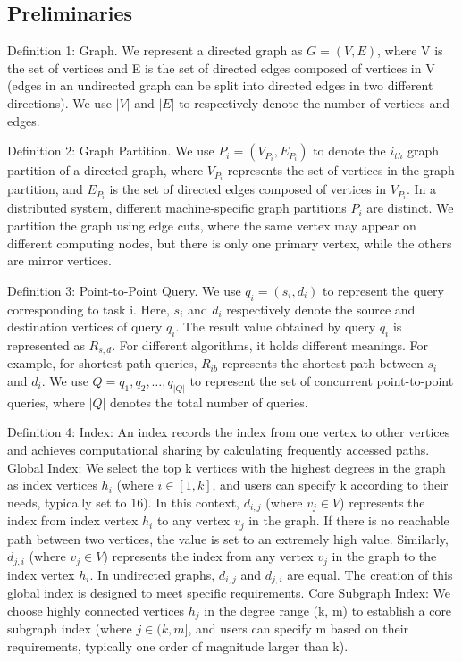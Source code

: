 \documentclass[lettersize,journal]{IEEEtran} %
\begin{document}
\subsection{Preliminaries}
Definition 1: Graph. We represent a directed graph as $G=(V,E)$, where V is the set of vertices and E is the set of directed edges composed of vertices in V (edges in an undirected graph can be split into directed edges in two different directions). We use $|V|$ and $|E|$ to respectively denote the number of vertices and edges.

Definition 2: Graph Partition. We use $P_i=(V_{P_i},E_{P_i})$ to denote the $i_{th}  $ graph partition of a directed graph, where $V_{P_i}$ represents the set of vertices in the graph partition, and $E_{P_i}$ is the set of directed edges composed of vertices in $V_{P_i}$. In a distributed system, different machine-specific graph partitions $P_i$ are distinct. We partition the graph using edge cuts, where the same vertex may appear on different computing nodes, but there is only one primary vertex, while the others are mirror vertices.

Definition 3: Point-to-Point Query. We use $q_i=(s_i,d_i)$ to represent the query corresponding to task i. Here, $s_i$ and $d_i$ respectively denote the source and destination vertices of query $q_i$. The result value obtained by query $q_i$ is represented as $R_{s,d}$. For different algorithms, it holds different meanings. For example, for shortest path queries, $R_{ib}$ represents the shortest path between $s_i$ and $d_i$. We use $Q={q_1,q_2,\ldots,q_{|Q|}}$ to represent the set of concurrent point-to-point queries, where $|Q|$ denotes the total number of queries.

Definition 4: Index: An index records the index from one vertex to other vertices and achieves computational sharing by calculating frequently accessed paths. Global Index: We select the top k vertices with the highest degrees in the graph as index vertices $h_i$ (where $i\in [1, k]$, and users can specify k according to their needs, typically set to 16). In this context, $d_{i,j}$ (where $v_j\in V$) represents the index from index vertex $h_i$ to any vertex $v_j$ in the graph. If there is no reachable path between two vertices, the value is set to an extremely high value. Similarly, $d_{j,i}$ (where $v_j\in V$) represents the index from any vertex $v_j$ in the graph to the index vertex $h_i$. In undirected graphs, $d_{i,j}$ and $d_{j,i}$ are equal. The creation of this global index is designed to meet specific requirements. Core Subgraph Index: We choose highly connected vertices $h_j$ in the degree range (k, m) to establish a core subgraph index (where $j\in (k, m]$, and users can specify m based on their requirements, typically one order of magnitude larger than k).
\end{document}
